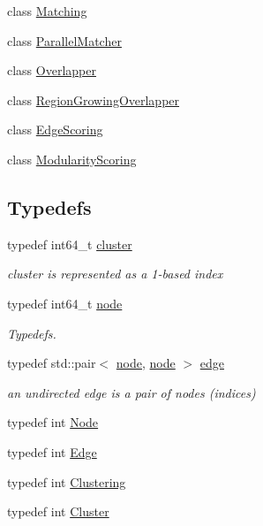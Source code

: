 \begin{DoxyCompactItemize}
class \hyperlink{class_ensemble_clustering_1_1_matching}{Matching}
\item 
class \hyperlink{class_ensemble_clustering_1_1_parallel_matcher}{Parallel\-Matcher}
\item 
class \hyperlink{class_ensemble_clustering_1_1_overlapper}{Overlapper}
\item 
class \hyperlink{class_ensemble_clustering_1_1_region_growing_overlapper}{Region\-Growing\-Overlapper}
\item 
class \hyperlink{class_ensemble_clustering_1_1_edge_scoring}{Edge\-Scoring}
\item 
class \hyperlink{class_ensemble_clustering_1_1_modularity_scoring}{Modularity\-Scoring}
\end{DoxyCompactItemize}
\subsection*{Typedefs}
\begin{DoxyCompactItemize}
\item 
typedef int64\-\_\-t \hyperlink{namespace_ensemble_clustering_a5ae38234e207add524443be6e597b970}{cluster}
\begin{DoxyCompactList}\small\item\em cluster is represented as a 1-\/based index \end{DoxyCompactList}\item 
typedef int64\-\_\-t \hyperlink{namespace_ensemble_clustering_ae829290aeccd1a420b17a37fd901f114}{node}
\begin{DoxyCompactList}\small\item\em Typedefs. \end{DoxyCompactList}\item 
typedef std\-::pair$<$ \hyperlink{namespace_ensemble_clustering_ae829290aeccd1a420b17a37fd901f114}{node}, \hyperlink{namespace_ensemble_clustering_ae829290aeccd1a420b17a37fd901f114}{node} $>$ \hyperlink{namespace_ensemble_clustering_aff19dd5e3051ee3d4360fd3f29daf16b}{edge}
\begin{DoxyCompactList}\small\item\em an undirected edge is a pair of nodes (indices) \end{DoxyCompactList}\item 
typedef int \hyperlink{namespace_ensemble_clustering_a136bcdc52fb2f62a89bc8bf8c1a7cb8f}{Node}
\item 
typedef int \hyperlink{namespace_ensemble_clustering_abb5f21f23a27c13de604d6ff457ac94b}{Edge}
\item 
typedef int \hyperlink{namespace_ensemble_clustering_a8376de7054d9b646ad127a6256989024}{Clustering}
\item 
typedef int \hyperlink{namespace_ensemble_clustering_a8d9740fbc7cc7696652cd8b6974121ac}{Cluster}
\end{DoxyCompactItemize}
